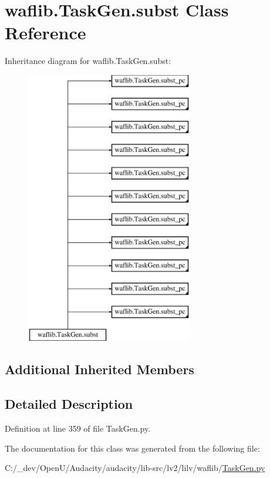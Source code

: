 \hypertarget{classwaflib_1_1_task_gen_1_1subst}{}\section{waflib.\+Task\+Gen.\+subst Class Reference}
\label{classwaflib_1_1_task_gen_1_1subst}
Inheritance diagram for waflib.\+Task\+Gen.\+subst\+:\begin{figure}[H]
\begin{center}
\leavevmode
\includegraphics[height=12.000000cm]{classwaflib_1_1_task_gen_1_1subst}
\end{center}
\end{figure}
\subsection*{Additional Inherited Members}


\subsection{Detailed Description}


Definition at line 359 of file Task\+Gen.\+py.



The documentation for this class was generated from the following file\+:\begin{DoxyCompactItemize}
\item 
C\+:/\+\_\+dev/\+Open\+U/\+Audacity/audacity/lib-\/src/lv2/lilv/waflib/\hyperlink{lilv_2waflib_2_task_gen_8py}{Task\+Gen.\+py}\end{DoxyCompactItemize}
